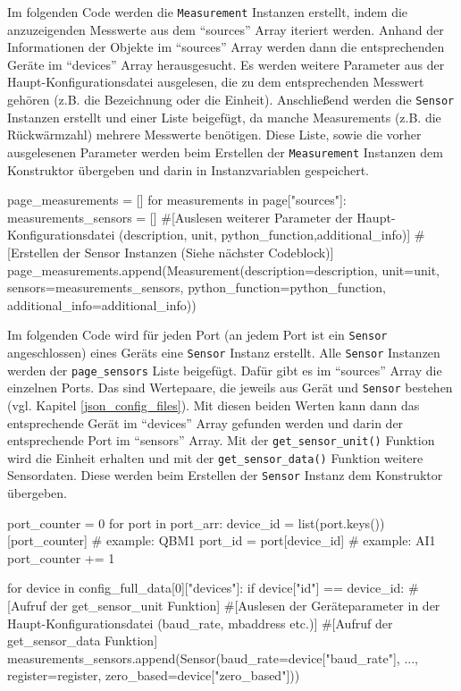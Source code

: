 Im folgenden Code werden die \lstinline{Measurement} Instanzen erstellt, indem die anzuzeigenden Messwerte aus dem \enquote{sources} Array iteriert werden. Anhand der Informationen der Objekte im \enquote{sources} Array werden dann die entsprechenden Geräte im \enquote{devices} Array herausgesucht. Es werden weitere Parameter aus der Haupt-Konfigurationsdatei ausgelesen, die zu dem entsprechenden Messwert gehören (z.B. die Bezeichnung oder die Einheit). Anschließend werden die \lstinline{Sensor} Instanzen erstellt und einer Liste beigefügt, da manche Measurements (z.B. die Rückwärmzahl) mehrere Messwerte benötigen. Diese Liste, sowie die vorher ausgelesenen Parameter werden beim Erstellen der \lstinline{Measurement} Instanzen dem Konstruktor übergeben und darin in Instanzvariablen gespeichert.
\begin{pythoncode}
page_measurements = []
for measurements in page["sources"]:
	measurements_sensors = []
	#[Auslesen weiterer Parameter der Haupt-Konfigurationsdatei (description, unit, python_function,additional_info)]
	#[Erstellen der Sensor Instanzen (Siehe nächster Codeblock)]
	page_measurements.append(Measurement(description=description, unit=unit, sensors=measurements_sensors, python_function=python_function, additional_info=additional_info))
\end{pythoncode}

Im folgenden Code wird für jeden Port (an jedem Port ist ein \lstinline{Sensor} angeschlossen) eines Geräts eine \lstinline{Sensor} Instanz erstellt. Alle \lstinline{Sensor} Instanzen werden der \lstinline{page_sensors} Liste beigefügt. Dafür gibt es im \enquote{sources} Array die einzelnen Ports. Das sind Wertepaare, die jeweils aus Gerät und \lstinline{Sensor} bestehen (vgl. Kapitel \ref{json_config_files}). Mit diesen beiden Werten kann dann das entsprechende Gerät im \enquote{devices} Array gefunden werden und darin der entsprechende Port im \enquote{sensors} Array. Mit der \lstinline{get_sensor_unit()} Funktion wird die Einheit erhalten und mit der \lstinline{get_sensor_data()} Funktion weitere Sensordaten. Diese werden beim Erstellen der \lstinline{Sensor} Instanz dem Konstruktor übergeben.
\begin{pythoncode}
port_counter = 0
for port in port_arr:
	device_id = list(port.keys())[port_counter] # example: QBM1
	port_id = port[device_id]  # example: AI1
	port_counter += 1
	
	for device in config_full_data[0]["devices"]:
		if device["id"] == device_id:
			#[Aufruf der get_sensor_unit Funktion]
			#[Auslesen der Geräteparameter in der Haupt-Konfigurationsdatei (baud_rate, mbaddress etc.)]
			#[Aufruf der get_sensor_data Funktion]
			measurements_sensors.append(Sensor(baud_rate=device["baud_rate"], ..., register=register, zero_based=device["zero_based"]))
\end{pythoncode}

